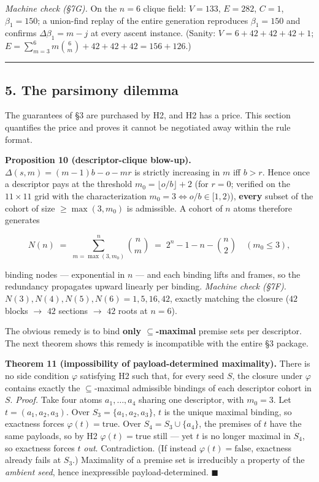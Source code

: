\documentclass[
  10pt,
]{article}
\begin{document}
\emph{Machine check (§7G).} On the \(n=6\) clique field: \(V = 133\),
\(E = 282\), \(C = 1\), \(\beta_1 = 150\); a union-find replay of the
entire generation reproduces \(\beta_1 = 150\) and confirms
\(\Delta\beta_1 = m - j\) at every ascent instance. (Sanity:
\(V = 6 + 42 + 42 + 42 + 1\);
\(E = \sum_{m=3}^{6} m\binom{6}{m} + 42 + 42 + 42 = 156 + 126\).)

\begin{center}\rule{0.5\linewidth}{0.5pt}\end{center}

\hypertarget{the-parsimony-dilemma}{%
\subsection{5. The parsimony dilemma}\label{the-parsimony-dilemma}}

The guarantees of §3 are purchased by H2, and H2 has a price. This
section quantifies the price and proves it cannot be negotiated away
within the rule format.

\textbf{Proposition 10 (descriptor-clique blow-up).}
\(\Delta(s,m) = (m-1)b - o - mr\) is strictly increasing in \(m\) iff
\(b > r\). Hence once a descriptor pays at the threshold
\(m_0 = \lfloor o/b \rfloor + 2\) (for \(r = 0\); verified on the
\(11\times 11\) grid with the characterization
\(m_0 = 3 \iff o/b \in [1,2)\)), \textbf{every} subset of the cohort of
size \(\ge \max(3, m_0)\) is admissible. A cohort of \(n\) atoms
therefore generates

\[N(n) \;=\; \sum_{m = \max(3, m_0)}^{n} \binom{n}{m} \;=\; 2^n - 1 - n - \binom{n}{2} \quad (m_0 \le 3),\]

binding nodes --- exponential in \(n\) --- and each binding lifts and
frames, so the redundancy propagates upward linearly per binding.
\emph{Machine check (§7F).} \(N(3),N(4),N(5),N(6) = 1, 5, 16, 42\),
exactly matching the closure (\(42\) blocks \(\to\) \(42\) sections
\(\to\) \(42\) roots at \(n = 6\)).

The obvious remedy is to bind \textbf{only \(\subseteq\)-maximal}
premise sets per descriptor. The next theorem shows this remedy is
incompatible with the entire §3 package.

\textbf{Theorem 11 (impossibility of payload-determined maximality).}
There is no side condition \(\varphi\) satisfying H2 such that, for
every seed \(S\), the closure under \(\varphi\) contains exactly the
\(\subseteq\)-maximal admissible bindings of each descriptor cohort in
\(S\). \emph{Proof.} Take four atoms \(a_1, \dots, a_4\) sharing one
descriptor, with \(m_0 = 3\). Let \(t = (a_1, a_2, a_3)\). Over
\(S_3 = \{a_1,a_2,a_3\}\), \(t\) is the unique maximal binding, so
exactness forces \(\varphi(t) = \mathrm{true}\). Over
\(S_4 = S_3 \cup \{a_4\}\), the premises of \(t\) have the same
payloads, so by H2 \(\varphi(t) = \mathrm{true}\) still --- yet \(t\) is
no longer maximal in \(S_4\), so exactness forces \(t\) \emph{out}.
Contradiction. (If instead \(\varphi(t) = \mathrm{false}\), exactness
already fails at \(S_3\).) Maximality of a premise set is irreducibly a
property of the \emph{ambient seed}, hence inexpressible
payload-determined. \(\blacksquare\)
\end{document}
